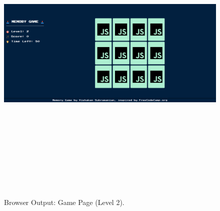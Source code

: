 \documentclass[12pt, a4]{article}
\begin{document}
\subsection*{}
\begin{figure}[h]
\centering
\caption{Browser Output: Game Page (Level 2).}
\includegraphics[height=15cm, width=18cm]{Output/NextLevel.png}
\end{figure}


\newpage
\end{document}
